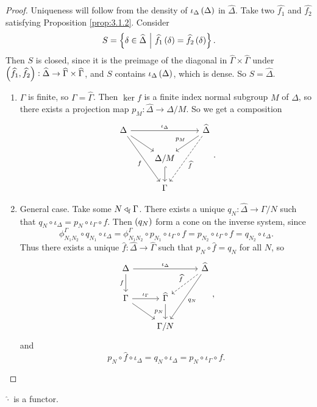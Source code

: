 \begin{proof}
Uniqueness will follow from the density of $ \iota_\Delta\br{\Delta} $ in $ \widehat{\Delta} $. Take two $ \widehat{f_1} $ and $ \widehat{f_2} $ satisfying Proposition \ref{prop:3.1.2}. Consider
$$ S = \cbr{\delta \in \widehat{\Delta} \st \widehat{f_1}\br{\delta} = \widehat{f_2}\br{\delta}}. $$
Then $ S $ is closed, since it is the preimage of the diagonal in $ \widehat{\Gamma} \times \widehat{\Gamma} $ under $ \br{\widehat{f_1}, \widehat{f_2}} : \widehat{\Delta} \to \widehat{\Gamma} \times \widehat{\Gamma} $, and $ S $ contains $ \iota_\Delta\br{\Delta} $, which is dense. So $ S = \widehat{\Delta} $.
\begin{enumerate}[leftmargin=0.5in, label=Case \arabic*.]
\item $ \Gamma $ is finite, so $ \Gamma = \widehat{\Gamma} $. Then $ \ker f $ is a finite index normal subgroup $ M $ of $ \Delta $, so there exists a projection map $ p_M : \widehat{\Delta} \to \Delta / M $. So we get a composition
$$
\begin{tikzcd}
\Delta \arrow{rr}{\iota_\Delta} \arrow{dr} \arrow{ddr}[swap]{f} & & \widehat{\Delta} \arrow{dl}[swap]{p_M} \arrow[dashed]{ddl}{\widehat{f}} \\
& \Delta / M \arrow[hookrightarrow]{d} & \\
& \Gamma &
\end{tikzcd}.
$$
\item General case. Take some $ N \triangleleft_{\mathrm{f}} \Gamma $. There exists a unique $ q_N : \widehat{\Delta} \to \Gamma / N $ such that $ q_N \circ \iota_\Delta = p_N \circ \iota_\Gamma \circ f $. Then $ \br{q_N} $ form a cone on the inverse system, since
$$ \phi_{N_1N_2}^\Gamma \circ q_{N_1} \circ \iota_\Delta = \phi_{N_1N_2}^\Gamma \circ p_{N_1} \circ \iota_\Gamma \circ f = p_{N_2} \circ \iota_\Gamma \circ f = q_{N_2} \circ \iota_\Delta. $$
Thus there exists a unique $ \widehat{f} : \widehat{\Delta} \to \widehat{\Gamma} $ such that $ p_N \circ \widehat{f} = q_N $ for all $ N $, so
$$
\begin{tikzcd}
\Delta \arrow{rr}{\iota_\Delta} \arrow{d}[swap]{f} & & \widehat{\Delta} \arrow[dashed]{dl}[swap]{\widehat{f}} \arrow{ddl}{q_N} \\
\Gamma \arrow{r}{\iota_\Gamma} \arrow{dr} & \widehat{\Gamma} \arrow{d}[swap]{p_N} & \\
& \Gamma / N &
\end{tikzcd},
$$
and
$$ p_N \circ \widehat{f} \circ \iota_\Delta = q_N \circ \iota_\Delta = p_N \circ \iota_\Gamma \circ f. $$
\end{enumerate}
\end{proof}

\begin{corollary}
$ \widehat{\cdot} $ is a functor.
\end{corollary}

